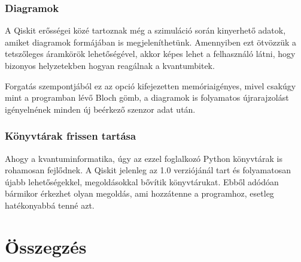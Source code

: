 \documentclass[
]{thesis-ekf}
\theoremstyle{definition}
\theoremstyle{remark}
\begin{document}
\subsection{Diagramok}
A Qiskit erősségei közé tartoznak még a szimuláció során kinyerhető adatok, amiket diagramok formájában is megjeleníthetünk. Amennyiben ezt ötvözzük a tetszőleges áramkörök lehetőségével, akkor képes lehet a felhasználó látni, hogy bizonyos helyzetekben hogyan reagálnak a kvantumbitek.

Forgatás szempontjából ez az opció kifejezetten memóriaigényes, mivel csakúgy mint a programban lévő Bloch gömb, a diagramok is folyamatos újrarajzolást igényelnének minden új beérkező szenzor adat után.

\subsection{Könyvtárak frissen tartása}
Ahogy a kvantuminformatika, úgy az ezzel foglalkozó Python könyvtárak is rohamosan fejlődnek. A Qiskit jelenleg az 1.0 verziójánál tart és folyamatosan újabb lehetőségekkel, megoldásokkal bővítik könyvtárukat. Ebből adódóan bármikor érkezhet olyan megoldás, ami hozzátenne a programhoz, esetleg hatékonyabbá tenné azt.

\chapter*{Összegzés}


\begin{thebibliography}{2}
\end{thebibliography}


\end{document}
